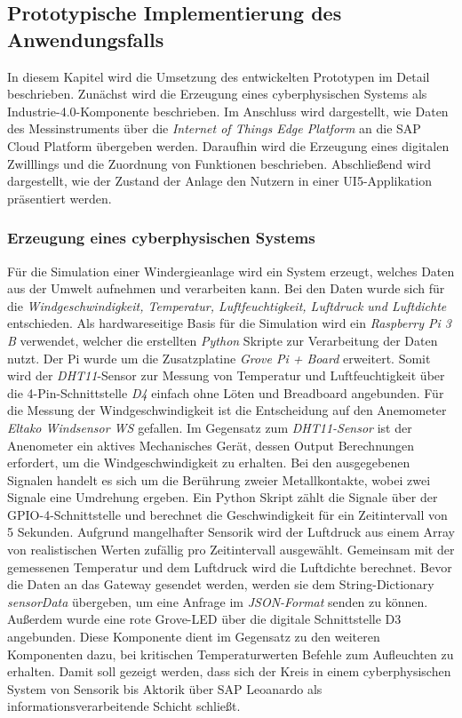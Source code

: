 

\subsection{Prototypische Implementierung des Anwendungsfalls}

In diesem Kapitel wird die Umsetzung des entwickelten Prototypen im Detail beschrieben.
Zunächst wird die Erzeugung eines cyberphysischen Systems als Industrie-4.0-Komponente beschrieben. Im Anschluss wird dargestellt, wie Daten des Messinstruments über die \textit{Internet of Things Edge Platform} an die SAP Cloud Platform übergeben werden. Daraufhin wird die Erzeugung eines digitalen Zwilllings und die Zuordnung von Funktionen beschrieben. Abschließend wird dargestellt, wie der Zustand der Anlage den Nutzern in einer UI5-Applikation präsentiert werden.

\subsubsection{Erzeugung eines cyberphysischen Systems}

Für die Simulation einer Windergieanlage wird ein System erzeugt, welches Daten aus der Umwelt aufnehmen und verarbeiten kann. Bei den Daten wurde sich für die \textit{Windgeschwindigkeit, Temperatur, Luftfeuchtigkeit, Luftdruck und Luftdichte} entschieden.
Als hardwareseitige Basis für die Simulation wird ein \textit{Raspberry Pi 3 B} verwendet, welcher die erstellten \textit{Python} Skripte zur Verarbeitung der Daten nutzt. Der Pi wurde um die Zusatzplatine \textit{Grove Pi + Board} erweitert. Somit wird der \textit{DHT11}-Sensor zur Messung von Temperatur und Luftfeuchtigkeit über die 4-Pin-Schnittstelle \textit{D4} einfach ohne Löten und Breadboard angebunden. Für die Messung der Windgeschwindigkeit ist die Entscheidung auf den Anemometer \textit{Eltako Windsensor WS} gefallen. Im Gegensatz zum \textit{DHT11-Sensor} ist der Anenometer ein aktives Mechanisches Gerät, dessen Output Berechnungen erfordert, um die Windgeschwindigkeit zu erhalten. Bei den ausgegebenen Signalen handelt es sich um die Berührung zweier Metallkontakte, wobei zwei Signale eine Umdrehung ergeben. Ein Python Skript zählt die Signale über der GPIO-4-Schnittstelle und berechnet die Geschwindigkeit für ein Zeitintervall von 5 Sekunden. Aufgrund mangelhafter Sensorik wird der Luftdruck aus einem Array von realistischen Werten zufällig pro Zeitintervall ausgewählt. Gemeinsam mit der gemessenen Temperatur und dem Luftdruck wird die Luftdichte berechnet. Bevor die Daten an das Gateway gesendet werden, werden sie dem String-Dictionary \textit{sensorData} übergeben, um eine Anfrage im \textit{JSON-Format} senden zu können. Außerdem wurde eine rote Grove-LED über die digitale Schnittstelle D3 angebunden. Diese Komponente dient im Gegensatz zu den weiteren Komponenten dazu, bei kritischen Temperaturwerten Befehle zum Aufleuchten zu erhalten. Damit soll gezeigt werden, dass sich der Kreis in einem cyberphysischen System von Sensorik bis Aktorik über SAP Leoanardo als informationsverarbeitende Schicht schließt.

